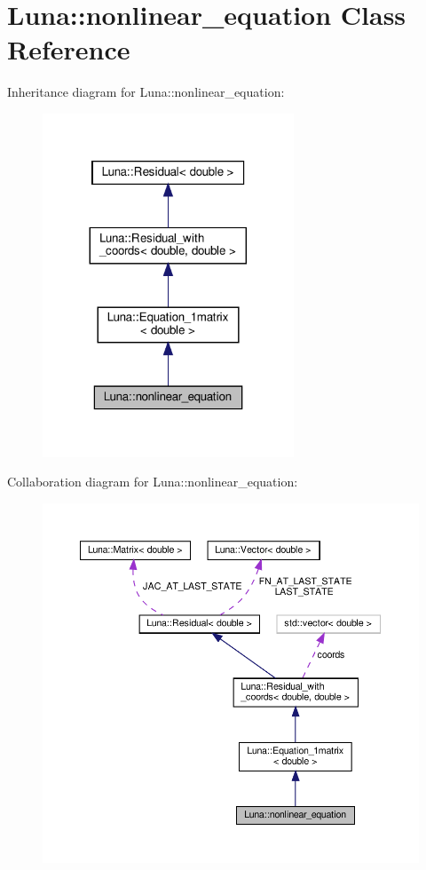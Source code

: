 \hypertarget{classLuna_1_1nonlinear__equation}{}\section{Luna\+:\+:nonlinear\+\_\+equation Class Reference}
\label{classLuna_1_1nonlinear__equation}


Inheritance diagram for Luna\+:\+:nonlinear\+\_\+equation\+:\nopagebreak
\begin{figure}[H]
\begin{center}
\leavevmode
\includegraphics[width=212pt]{classLuna_1_1nonlinear__equation__inherit__graph}
\end{center}
\end{figure}


Collaboration diagram for Luna\+:\+:nonlinear\+\_\+equation\+:\nopagebreak
\begin{figure}[H]
\begin{center}
\leavevmode
\includegraphics[width=350pt]{classLuna_1_1nonlinear__equation__coll__graph}
\end{center}
\end{figure}
